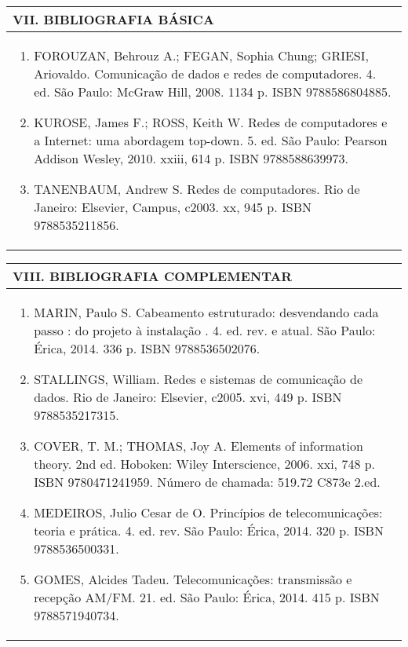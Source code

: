 \documentclass[12pt]{article}
\begin{document}
\newpage


\begin{longtable}{|L{1.025\textwidth}|} \hline
%
{\bf VII. BIBLIOGRAFIA BÁSICA} \\ \hline

\begin{enumerate}
\item FOROUZAN, Behrouz A.; FEGAN, Sophia Chung; GRIESI, Ariovaldo. Comunicação de dados e redes de computadores. 4. ed. São Paulo: McGraw Hill, 2008. 1134 p. ISBN 9788586804885.
\item KUROSE, James F.; ROSS, Keith W. Redes de computadores e a Internet: uma abordagem top-down. 5. ed. São Paulo: Pearson Addison Wesley, 2010. xxiii, 614 p. ISBN 9788588639973.
\item TANENBAUM, Andrew S. Redes de computadores. Rio de Janeiro: Elsevier, Campus, c2003. xx, 945 p. ISBN 9788535211856.
\end{enumerate}
 \\ \hline
\end{longtable}



\begin{longtable}{|L{1.025\textwidth}|} \hline
%
{\bf VIII. BIBLIOGRAFIA COMPLEMENTAR} \\ \hline
\begin{enumerate}
\item MARIN, Paulo S. Cabeamento estruturado: desvendando cada passo : do projeto à instalação . 4. ed. rev. e atual. São Paulo: Érica, 2014. 336 p. ISBN 9788536502076.
\item STALLINGS, William. Redes e sistemas de comunicação de dados. Rio de Janeiro: Elsevier, c2005. xvi, 449 p. ISBN 9788535217315.
\item COVER, T. M.; THOMAS, Joy A. Elements of information theory. 2nd ed. Hoboken: Wiley Interscience, 2006. xxi, 748 p. ISBN 9780471241959.
Número de chamada: 519.72 C873e 2.ed.
\item MEDEIROS, Julio Cesar de O. Princípios de telecomunicações: teoria e prática. 4. ed. rev. São Paulo: Érica, 2014. 320 p. ISBN 9788536500331.
\item GOMES, Alcides Tadeu. Telecomunicações: transmissão e recepção AM/FM. 21. ed. São Paulo: Érica, 2014. 415 p. ISBN 9788571940734.
%
\end{enumerate}
 \\ \hline
\end{longtable}



\end{document}
